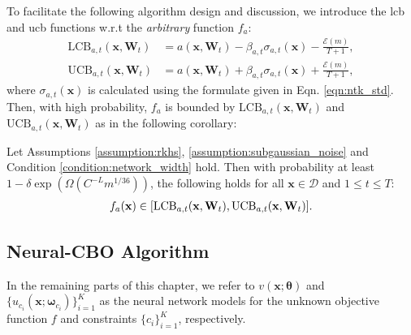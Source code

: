 To facilitate the following algorithm design and discussion, we introduce the \acf{lcb} and \acf{ucb} functions w.r.t the \textit{arbitrary} function $f_a$: 
\begin{align*}
\text{LCB}_{a,t}(\mathbf{x}, \mathbf{W}_{t}) &= a(\mathbf{x}, \mathbf{W}_{t}) - \beta_{a,t} \sigma_{a,t} (\mathbf{x}) - \frac{\mathcal{E}(m)}{T+1},
\\
\text{UCB}_{a,t}(\mathbf{x}, \mathbf{W}_{t}) &= a(\mathbf{x}, \mathbf{W}_{t}) + \beta_{a,t} \sigma_{a,t} (\mathbf{x}) + \frac{\mathcal{E}(m)}{T+1},  
\end{align*}
where $\sigma_{a,t}(\mathbf{x})$ is calculated using the formulate given in Eqn. \ref{eqn:ntk_std}. Then, with high probability,  $f_a$ is bounded by $\text{LCB}_{a,t}(\mathbf{x}, \mathbf{W}_{t})$ and $\text{UCB}_{a,t}(\mathbf{x}, \mathbf{W}_{t})$ as in the following corollary:
\begin{corollary}
\label{corrolary:f_in_lcb_ucb}
Let Assumptions \ref{assumption:rkhs}, \ref{assumption:subgaussian_noise} and Condition \ref{condition:network_width} hold. Then with probability at least $1 - \delta \exp (\Omega(C^{-L} m^{1/36}))$, the following holds for all $\mathbf{x} \in \mathcal{D}$
and $1 \le t \le T$:
\begin{align*}
    f_a (\mathbf{x}) \in [\textnormal{LCB}_{a,t}(\mathbf{x}, \mathbf{W}_{t}), \textnormal{UCB}_{a,t}(\mathbf{x}, \mathbf{W}_{t})].
\end{align*}
\end{corollary}
\subsection{Neural-CBO Algorithm}
In the remaining parts of this chapter, we refer to $v(\mathbf{x}; \boldsymbol{\theta})$ and $\{u_{c_i}(\mathbf{x}; \boldsymbol{\omega}_{c_i})\}_{i=1}^K$ as the neural network models for the unknown objective function $f$ and constraints $\{c_i\}_{i=1}^K$, respectively. 

